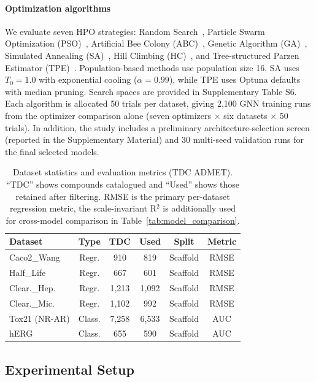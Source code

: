 \documentclass[journal]{IEEEtran}
\begin{document}
\paragraph{Optimization algorithms}
We evaluate seven HPO strategies: Random Search~\cite{bergstra2012random}, Particle Swarm Optimization (PSO)~\cite{kennedy1995pso}, Artificial Bee Colony (ABC)~\cite{karaboga2005abc}, Genetic Algorithm (GA)~\cite{holland1975ga}, Simulated Annealing (SA)~\cite{saopt}, Hill Climbing (HC)~\cite{russell2010aima}, and Tree-structured Parzen Estimator (TPE)~\cite{akiba2019optuna}. Population-based methods use population size 16. SA uses $T_0=1.0$ with exponential cooling ($\alpha=0.99$), while TPE uses Optuna defaults with median pruning. Search spaces are provided in Supplementary Table S6. Each algorithm is allocated 50 trials per dataset, giving 2{,}100 GNN training runs from the optimizer comparison alone (seven optimizers $\times$ six datasets $\times$ 50 trials). In addition, the study includes a preliminary architecture-selection screen (reported in the Supplementary Material) and 30 multi-seed validation runs for the final selected models.

\begin{table}[!t]
\centering
\caption{Dataset statistics and evaluation metrics (TDC ADMET). ``TDC'' shows compounds catalogued and ``Used'' shows those retained after filtering. RMSE is the primary per-dataset regression metric, the scale-invariant R$^2$ is additionally used for cross-model comparison in Table~\ref{tab:model_comparison}.}
\label{tab:dataset_stats}
\small
\begin{tabular}{lccccc}
\toprule
\textbf{Dataset} & \textbf{Type} & \textbf{TDC} & \textbf{Used} & \textbf{Split} & \textbf{Metric} \\
\midrule
Caco2\_Wang & Regr. & 910 & 819 & Scaffold & RMSE \\
Half\_Life & Regr. & 667 & 601 & Scaffold & RMSE \\
Clear.\_Hep. & Regr. & 1,213 & 1,092 & Scaffold & RMSE \\
Clear.\_Mic. & Regr. & 1,102 & 992 & Scaffold & RMSE \\
Tox21 (NR-AR) & Class. & 7,258 & 6,533 & Scaffold & AUC \\
hERG & Class. & 655 & 590 & Scaffold & AUC \\
\bottomrule
\end{tabular}
\end{table}

\subsection{Experimental Setup}
\label{sec:experimental_setup}
\end{document}
